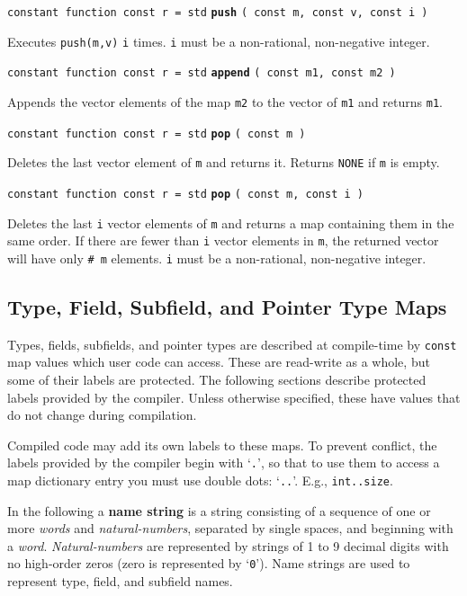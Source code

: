 \documentclass[12pt]{article}
\newcommand{\key}[1]{{\rm \bfseries #1}}
\newcommand{\ttkey}[1]{{\tt \bfseries #1}}
\newenvironment{indpar}[1][0.3in]%
	{\begin{list}{}%
		     {\setlength{\itemsep}{0in}%
		      \setlength{\topsep}{0in}%
		      \setlength{\parsep}{1ex}%
		      \setlength{\labelwidth}{#1}%
		      \setlength{\leftmargin}{#1}%
		      \addtolength{\leftmargin}{\labelsep}}%
	 \item}%
	{\end{list}}
\begin{document}
{\tt constant function const r = std} \ttkey{push}
    {\tt ( const m, const v, const i )}
\begin{indpar}
Executes {\tt push(m,v)} {\tt i} times.  {\tt i} must be a
non-rational, non-negative integer.
\end{indpar}

{\tt constant function const r = std} \ttkey{append}
    {\tt ( const m1, const m2 )}
\begin{indpar}
Appends the vector elements of the map {\tt m2} to the vector of {\tt m1}
and returns {\tt m1}.
\end{indpar}

{\tt constant function const r = std} \ttkey{pop} {\tt ( const m )}
\begin{indpar}
Deletes the last vector element of {\tt m} and returns it.
Returns {\tt NONE} if {\tt m} is empty.
\end{indpar}

{\tt constant function const r = std} \ttkey{pop} {\tt ( const m, const i )}
\begin{indpar}
Deletes the last {\tt i} vector elements of {\tt m} and returns a map
containing them in the same order.
If there are fewer than {\tt i} vector elements
in {\tt m}, the returned vector will have only {\tt \# m} elements.
{\tt i} must be a non-rational, non-negative integer.
\end{indpar}

\subsection{Type, Field, Subfield, and Pointer Type Maps}
\label{TYPE-FIELD-SUBFIELD-MAPS}

Types, fields, subfields, and pointer types are described
at compile-time by {\tt const} map values which
user code can access.
These are read-write as a whole, but some of their
labels are protected.  The following sections describe protected labels
provided by the compiler.  Unless otherwise specified,
these have values that do not change during compilation.

Compiled code may add its own labels to these maps.
To prevent conflict, the labels provided by the compiler
begin with `{\tt .}', so
that to use them to access a map dictionary entry
you must use double dots: `{\tt ..}'.
E.g., {\tt int..size}.

In the following a \key{name string} is a string
consisting of a sequence of one or more {\em words}
and {\em natural-numbers}, separated
by single spaces, and beginning with a {\em word}.
{\em Natural-numbers} are represented
by strings of 1 to 9 decimal digits with no high-order
zeros (zero is represented by `{\tt 0}').
Name strings are used to represent type, field, and subfield
names.
\end{document}
